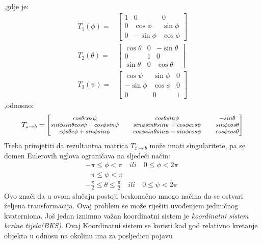 ,gdje je:
\begin{align}
    T_1(\phi) =& \begin{bmatrix}
        1 & 0 & 0\\
        0 & \cos\phi & \sin\phi \\
        0 & -\sin\phi & \cos\phi 
    \end{bmatrix}\\
     T_2(\theta)=& \begin{bmatrix}
        \cos\theta & 0 & -\sin\theta \\
         0 & 1 & 0\\
         \sin\theta & 0 & \cos\theta
    \end{bmatrix}\\
    T_3(\psi) = &\begin{bmatrix}
        \cos\psi & \sin\phi & 0\\
        -\sin\phi & \cos\phi & 0\\
        0 & 0 & 1
    \end{bmatrix}
\end{align}
,odnosno:
\begin{equation}
    {\footnotesize
    T_{z \to b}=\begin{bmatrix}
        cos\theta cos\psi && cos\theta sin\psi && -sin\theta\\
        sin\phi sin\theta cos\psi-cos\phi sin\psi && sin\phi sin\theta sin\psi +cos\phi cos\psi&& sin\phi cos\theta\\
        c\phi s\theta c\psi+sin\phi sin\psi && cos\phi sin\theta sin\psi -sin\phi cos\psi&& cos\phi cos\theta\\
    \end{bmatrix}}
\end{equation}
Treba primjetiti da rezultantna matrica $T_{z \to b}$ može imati singularitete, pa se domen
Eulerovih uglova ograničava na sljedeći način:
\begin{align*}
    -\pi \leq \phi <\pi \quad ili \quad 0\leq\phi<2\pi \\
    -\pi \leq \psi <\pi \qquad \qquad \qquad \qquad \\
    -\frac{\pi}{2}\leq \theta \leq \frac{\pi}{2} \quad ili \quad 0\leq\psi<2\pi
\end{align*}
Ovo znači da u ovom slučaju postoji beskonačno mnogo načina da se ostvari željena transformacija.
Ovaj problem se može riješiti uvođenjem jediničnog kvaterniona.
Još jedan iznimno važan koordinatni sistem je \textit{koordinatni sistem brzine tijela(BKS)}. Ovaj Koordinatni
sistem se koristi kad god relativno kretanje objekta u odnosu na okolinu ima za posljedicu pojavu 
